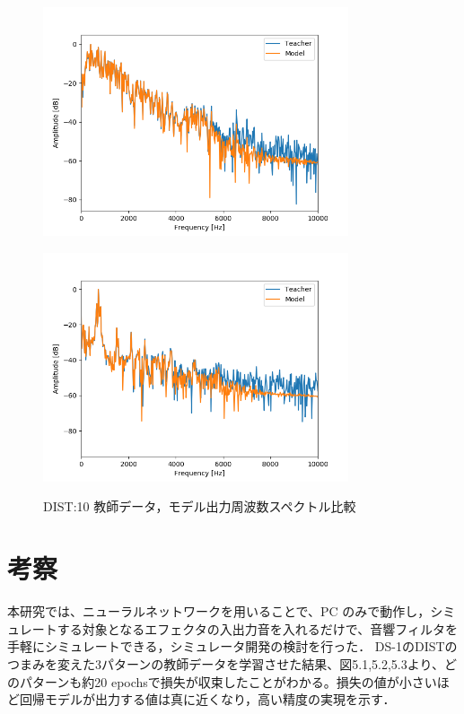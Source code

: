 \documentclass{jreport}		%
\begin{document}
\begin{figure}[htbp]
 \begin{minipage}{0.5\hsize}
 \begin{center}
  \includegraphics[width=90mm]{gain10_fft_hikaku.png}
 \end{center}
 \label{fig:one}
 \end{minipage}
 \begin{minipage}{0.5\hsize}
 \begin{center}
  \includegraphics[width=90mm]{gain10_fft_hikaku2.png}
 \end{center}
 \label{fig:two}
 \end{minipage}
 \caption{DIST:10 教師データ，モデル出力周波数スペクトル比較}
\end{figure}

\chapter{考察}
本研究では、ニューラルネットワークを用いることで、PC のみで動作し，シミュレートする対象となるエフェクタの入出力音を入れるだけで、音響フィルタを手軽にシミュレートできる，シミュレータ開発の検討を行った．
DS-1のDISTのつまみを変えた3パターンの教師データを学習させた結果、図5.1,5.2,5.3より、どのパターンも約20 epochsで損失が収束したことがわかる。損失の値が小さいほど回帰モデルが出力する値は真に近くなり，高い精度の実現を示す．
\end{document}
